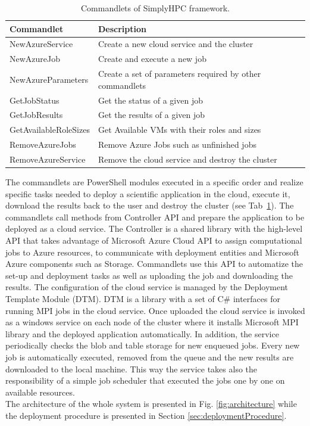 \documentclass[3p,times]{elsarticle}
\begin{document}
\begin{table}
	\centering		
		\begin{tabular}{|l|l|}
		\hline
      \textbf{Commandlet} & \textbf{Description} \\ \hline
      NewAzureService & Create a new cloud service and the cluster \\ \hline
			NewAzureJob & Create and execute a new job \\ \hline
			NewAzureParameters & Create a set of parameters required by other commandlets    \\ \hline
			GetJobStatus & Get the status of a given job    \\ \hline
			GetJobResults & Get the results of a given job  \\ \hline
			GetAvailableRoleSizes & Get Available VMs with their roles and sizes \\ \hline
			RemoveAzureJobs & Remove Azure Jobs such as unfinished jobs \\ \hline
			RemoveAzureService & Remove the cloud service and destroy the cluster \\ \hline
    \end{tabular}
	\caption{Commandlets of SimplyHPC framework.}
	\label{tab:CommandletsOfSimplyHPC}
\end{table}

The commandlets are PowerShell modules executed in a specific order and realize specific tasks needed to deploy a scientific application in the cloud, execute it, download the results back to the user and destroy the cluster (see Tab~\ref{tab:CommandletsOfSimplyHPC}). The commandlets call methods from Controller API and prepare the application to be deployed as a cloud service. 
The Controller is a shared library with the high-level API that takes advantage of Microsoft Azure Cloud API to assign computational jobs to Azure resources, to communicate with deployment entities and Microsoft Azure components such as Storage. Commandlets use this API to automatize the set-up and deployment tasks as well as uploading the job and downloading the results. 
The configuration of the cloud service is managed by the Deployment Template Module (DTM). DTM is a library with a set of C\# interfaces for running MPI jobs in the cloud service. Once uploaded the cloud service is invoked as a windows service on each node of the cluster where it installs Microsoft MPI library and the deployed application automatically.
In addition, the service periodically checks the blob and table storage for new enqueued jobs. Every new job is automatically executed,  removed from the queue and the new results are downloaded to the local machine. This way the service takes also the responsibility of a simple job scheduler that executed the jobs one by one on available resources. \\
The architecture of the whole system is presented in Fig. \ref{fig:architecture} while the deployment procedure is presented in Section \ref{sec:deploymentProcedure}. 
\end{document}

